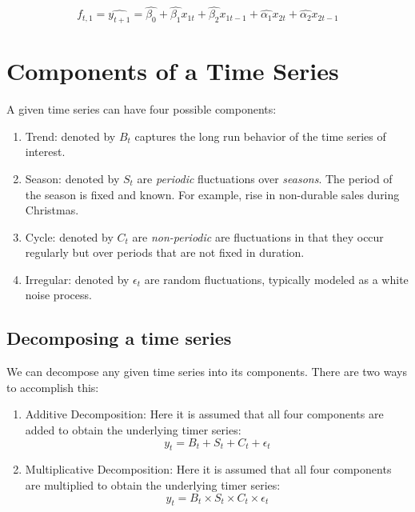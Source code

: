 \documentclass[]{book}
\theoremstyle{definition}
\theoremstyle{definition}
\theoremstyle{definition}
\theoremstyle{remark}
\begin{document}
\begin{equation}
f_{t,1}=\widehat{y_{t+1}}=\hat{\beta_0}+\hat{\beta_1}x_{1t} + \hat{\beta_2}x_{1t-1}+ \hat{\alpha_1}x_{2t}+\hat{\alpha_2}x_{2t-1}
\end{equation}

\hypertarget{components-of-a-time-series}{%
\chapter{Components of a Time Series}\label{components-of-a-time-series}}

A given time series can have four possible components:

\begin{enumerate}
\def\labelenumi{\arabic{enumi}.}
\item
  Trend: denoted by \(B_t\) captures the long run behavior of the time series of interest.
\item
  Season: denoted by \(S_t\) are \emph{periodic} fluctuations over \emph{seasons}. The period of the season is fixed and known. For example, rise in non-durable sales during Christmas.
\item
  Cycle: denoted by \(C_t\) are \emph{non-periodic} are fluctuations in that they occur regularly but over periods that are not fixed in duration.
\item
  Irregular: denoted by \(\epsilon_t\) are random fluctuations, typically modeled as a white noise process.
\end{enumerate}

\hypertarget{decomposing-a-time-series}{%
\section{Decomposing a time series}\label{decomposing-a-time-series}}

We can decompose any given time series into its components. There are two ways to accomplish this:

\begin{enumerate}
\def\labelenumi{\arabic{enumi}.}
\item
  Additive Decomposition: Here it is assumed that all four components are added to obtain the underlying timer series:
  \begin{equation}
  y_t= B_t+S_t+C_t +\epsilon_t
  \end{equation}
\item
  Multiplicative Decomposition: Here it is assumed that all four components are multiplied to obtain the underlying timer series:
  \begin{equation}
  y_t= B_t \times S_t \times C_t \times \epsilon_t
  \end{equation}
\end{enumerate}
\end{document}

